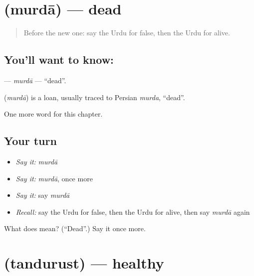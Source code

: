 \section[\texorpdfstring{\ur{مردہ} (murdā)}{مردہ (murdā)}]{ (murdā) — dead}

\label{lesson:UR-C248-murda}



\begin{quote}
Before the new one: say the Urdu for false, then the Urdu for alive.
\end{quote}

\subsection*{You'll want to know: }
\textbf{} — \emph{murdā} — \textquotedblleft{}dead\textquotedblright{}.

\begin{cousinweb}
\textbf{} (\emph{murdā}) is a loan, usually traced to Persian \emph{murda}, \textquotedblleft{}dead\textquotedblright{}.
\end{cousinweb}

\begin{grammarlens}[title={What you've built}]
One more word for this chapter.
\end{grammarlens}

\subsection*{Your turn}
\begin{itemize}
\raggedright
  \item \emph{Say it:} \emph{murdā}
  \item \emph{Say it:} \emph{murdā}, once more
  \item \emph{Say it:} say \emph{murdā}
  \item \emph{Recall:} say the Urdu for false, then the Urdu for alive, then say \emph{murdā} again
\end{itemize}

\begin{tcolorbox}[breakable,colback=teal!4,colframe=teal!35!black,title={Before you move on}]
What does  mean? (\textquotedblleft{}Dead\textquotedblright{}.) Say it once more.
\end{tcolorbox}
\section[\texorpdfstring{\ur{تندرست} (tandurust)}{تندرست (tandurust)}]{ (tandurust) — healthy}

